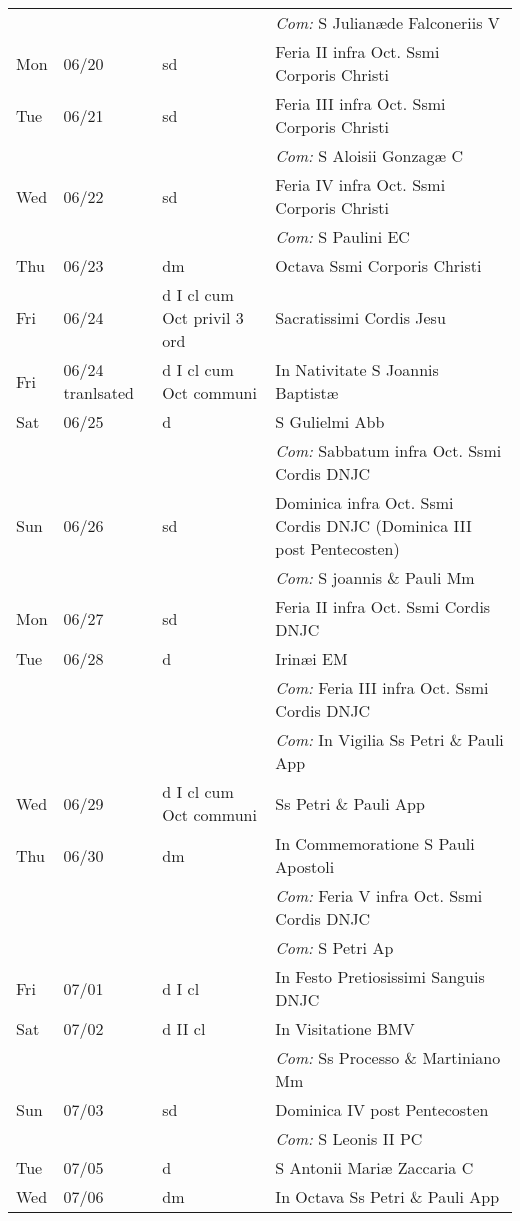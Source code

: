 \documentclass[10pt]{article}
\begin{document}
\begin{longtable}{ l l l l }
 & & & \textit{Com:} S Julianæde Falconeriis V\\
Mon & 06/20 & sd & Feria II infra Oct. Ssmi Corporis Christi\\
Tue & 06/21 & sd & Feria III infra Oct. Ssmi Corporis Christi\\
 & & & \textit{Com:} S Aloisii Gonzagæ C\\
Wed & 06/22 & sd & Feria IV infra Oct. Ssmi Corporis Christi\\
 & & & \textit{Com:} S Paulini EC\\
Thu & 06/23 & dm & Octava Ssmi Corporis Christi\\
Fri & 06/24 & d I cl cum Oct privil 3 ord & Sacratissimi Cordis Jesu\\
Fri & 06/24 tranlsated & d I cl cum Oct communi & In Nativitate S Joannis Baptistæ\\
Sat & 06/25 & d & S Gulielmi Abb\\
 & & & \textit{Com:} Sabbatum infra Oct. Ssmi Cordis DNJC\\
Sun & 06/26 & sd & Dominica infra Oct. Ssmi Cordis DNJC (Dominica III post Pentecosten)\\
 & & & \textit{Com:} S joannis \& Pauli Mm\\
Mon & 06/27 & sd & Feria II infra Oct. Ssmi Cordis DNJC\\
Tue & 06/28 & d & Irinæi EM\\
 & & & \textit{Com:} Feria III infra Oct. Ssmi Cordis DNJC\\
 & & & \textit{Com:} In Vigilia Ss Petri \& Pauli App\\
Wed & 06/29 & d I cl cum Oct communi & Ss Petri \& Pauli App\\
Thu & 06/30 & dm & In Commemoratione S Pauli Apostoli\\
 & & & \textit{Com:} Feria V infra Oct. Ssmi Cordis DNJC\\
 & & & \textit{Com:} S Petri Ap\\
Fri & 07/01 & d I cl & In Festo Pretiosissimi Sanguis DNJC\\
Sat & 07/02 & d II cl & In Visitatione BMV\\
 & & & \textit{Com:} Ss Processo \& Martiniano Mm\\
Sun & 07/03 & sd & Dominica IV post Pentecosten\\
 & & & \textit{Com:} S Leonis II PC\\
Tue & 07/05 & d & S Antonii Mariæ Zaccaria C\\
Wed & 07/06 & dm & In Octava Ss Petri \& Pauli App\\

\end{longtable}
\end{document}
